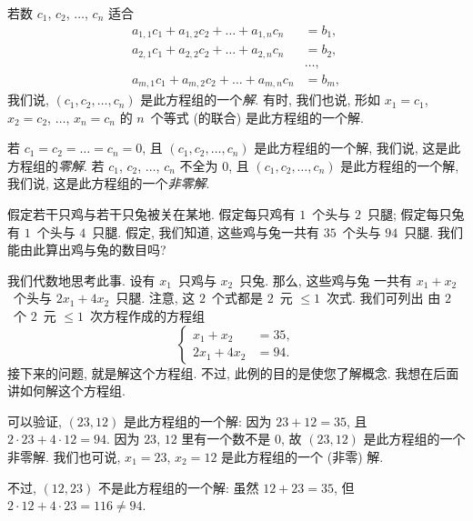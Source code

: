 \documentclass[../libro.tex]{subfiles}
\begin{document}
若数 \(c_1\), \(c_2\), \(\dots\), \(c_n\) 适合
\begin{align*}
    a_{1,1} c_1 + a_{1,2} c_2 + \dots + a_{1,n} c_n & = b_1, \\
    a_{2,1} c_1 + a_{2,2} c_2 + \dots + a_{2,n} c_n & = b_2, \\
    & \dots, \\
    a_{m,1} c_1 + a_{m,2} c_2 + \dots + a_{m,n} c_n & = b_m,
\end{align*}
我们说, \((c_1, c_2, \dots, c_n)\)
是此方程组的一个\emph{解}.
有时, 我们也说, 形如
\(x_1 = c_1\),
\(x_2 = c_2\),
\(\dots\),
\(x_n = c_n\)
的 \(n\)~个等式 (的联合)
是此方程组的一个解.

若 \(c_1 = c_2 = \dots = c_n = 0\),
且 \((c_1, c_2, \dots, c_n)\) 是此方程组的一个解,
我们说, 这是此方程组的\emph{零解}.
若 \(c_1\), \(c_2\), \(\dots\), \(c_n\) 不全为 \(0\),
且 \((c_1, c_2, \dots, c_n)\) 是此方程组的一个解,
我们说, 这是此方程组的一个\emph{非零解}.

\begin{example}
    假定若干只鸡与若干只兔被关在某地.
    假定每只鸡有 \(1\)~个头与 \(2\)~只腿;
    假定每只兔有 \(1\)~个头与 \(4\)~只腿.
    假定, 我们知道,
    这些鸡与兔一共有 \(35\)~个头与 \(94\)~只腿.
    我们能由此算出鸡与兔的数目吗?

    我们代数地思考此事.
    设有 \(x_1\)~只鸡与 \(x_2\)~只兔.
    那么,
    这些鸡与兔%
    一共有 \(x_1 + x_2\)~个头与 \(2x_1 + 4x_2\)~只腿.
    注意, 这 \(2\)~个式都是 \(2\)~元 \({\leq} 1\)~次式.
    我们可列出%
    由 \(2\)~个 \(2\)~元 \({\leq} 1\)~次方程作成的方程组
    \begin{equation*}
        \left\{ %
        \begin{aligned}
            x_1 + x_2   & = 35, \\
            2x_1 + 4x_2 & = 94.
        \end{aligned}
        \right. %
    \end{equation*}
    接下来的问题, 就是解这个方程组.
    不过,
    此例的目的是使您了解概念.
    我想在后面讲如何解这个方程组.

    可以验证, \((23, 12)\) 是此方程组的一个解:
    因为 \(23 + 12 = 35\),
    且 \(2 \cdot 23 + 4 \cdot 12 = 94\).
    因为 \(23\), \(12\) 里有一个数不是 \(0\),
    故 \((23, 12)\) 是此方程组的一个非零解.
    我们也可说,
    \(x_1 = 23\),
    \(x_2 = 12\)
    是此方程组的一个 (非零) 解.

    不过, \((12, 23)\) 不是此方程组的一个解:
    虽然 \(12 + 23 = 35\),
    但 \(2 \cdot 12 + 4 \cdot 23 = 116 \neq 94\).
\end{example}
\end{document}
